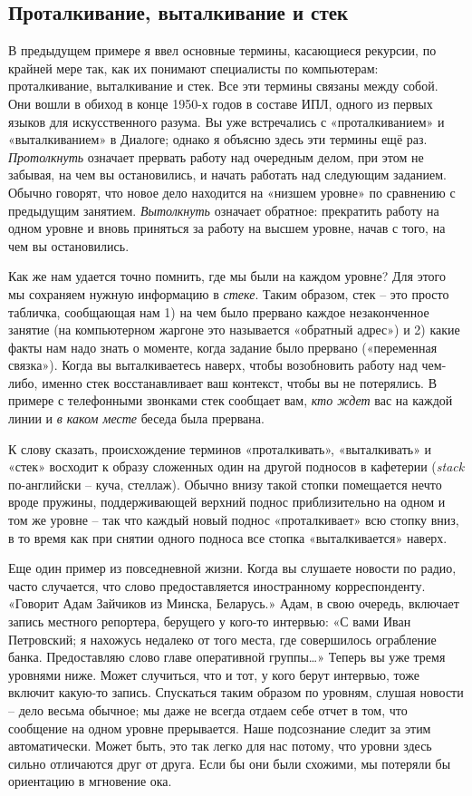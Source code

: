 \documentclass[../main.tex]{subfiles}
\begin{document}
\subsection{Проталкивание, выталкивание и стек}

В предыдущем примере я ввел основные термины, касающиеся рекурсии, по крайней мере так, как их понимают специалисты по компьютерам: проталкивание, выталкивание и стек. Все эти термины связаны между собой. Они вошли в обиход в конце 1950-х годов в составе ИПЛ, одного из первых языков для искусственного разума. Вы уже встречались с «проталкиванием» и «выталкиванием» в Диалоге; однако я объясню здесь эти термины ещё раз. \emph{Протолкнуть} означает прервать работу над очередным делом, при этом не забывая, на чем вы остановились, и начать работать над следующим заданием. Обычно говорят, что новое дело находится на «низшем уровне» по сравнению с предыдущим занятием. \emph{Вытолкнуть} означает обратное: прекратить работу на одном уровне и вновь приняться за работу на высшем уровне, начав с того, на чем вы остановились.

Как же нам удается точно помнить, где мы были на каждом уровне? Для этого мы сохраняем нужную информацию в \emph{стеке}. Таким образом, стек \--- это просто табличка, сообщающая нам 1) на чем было прервано каждое незаконченное занятие (на компьютерном жаргоне это называется «обратный адрес») и 2) какие факты нам надо знать о моменте, когда задание было прервано («переменная связка»). Когда вы выталкиваетесь наверх, чтобы возобновить работу над чем-либо, именно стек восстанавливает ваш контекст, чтобы вы не потерялись. В примере с телефонными звонками стек сообщает вам, \emph{кто ждет} вас на каждой линии и \emph{в каком месте} беседа была прервана.

К слову сказать, происхождение терминов «проталкивать», «выталкивать» и «стек» восходит к образу сложенных один на другой подносов в кафетерии (\emph{stack} по-английски \--- куча, стеллаж). Обычно внизу такой стопки помещается нечто вроде пружины, поддерживающей верхний поднос приблизительно на одном и том же уровне \--- так что каждый новый поднос «проталкивает» всю стопку вниз, в то время как при снятии одного подноса все стопка «выталкивается» наверх.

Еще один пример из повседневной жизни. Когда вы слушаете новости по радио, часто случается, что слово предоставляется иностранному корреспонденту. «Говорит Адам Зайчиков из Минска, Беларусь.» Адам, в свою очередь, включает запись местного репортера, берущего у кого-то интервью: «С вами Иван Петровский; я нахожусь недалеко от того места, где совершилось ограбление банка. Предоставляю слово главе оперативной группы\ldots» Теперь вы уже тремя уровнями ниже. Может случиться, что и тот, у кого берут интервью, тоже включит какую-то запись. Спускаться таким образом по уровням, слушая новости \--- дело весьма обычное; мы даже не всегда отдаем себе отчет в том, что сообщение на одном уровне прерывается. Наше подсознание следит за этим автоматически. Может быть, это так легко для нас потому, что уровни здесь сильно отличаются друг от друга. Если бы они были схожими, мы потеряли бы ориентацию в мгновение ока.
\end{document}
